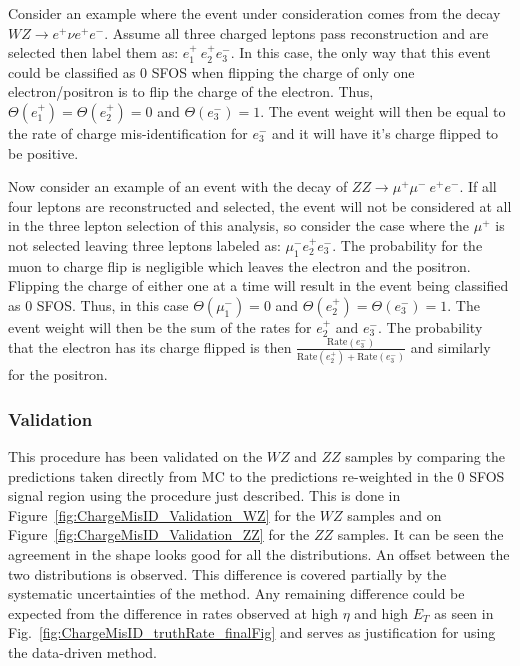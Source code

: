 Consider an example where the event under consideration comes from the 
decay $WZ\rightarrow e^{+}\nu e^{+}e^{-}$. Assume all three charged leptons 
pass reconstruction and are selected then label 
them as: $e^{+}_1~e^{+}_2e^{-}_3$. In this case,
the only way that this event could be classified as 0 SFOS when 
flipping the charge of only one electron/positron is to flip the 
charge of the electron.
Thus, $\Theta(e^{+}_1)=\Theta(e^{+}_2)=0$ and $\Theta(e^{-}_3)=1$.  The event 
weight will then be equal to the rate of charge mis-identification 
for  $e^{-}_3$ and it will have it's charge flipped to be positive.

Now consider an example of an event with 
the decay of $ZZ\rightarrow \mu^{+}\mu^{-}~ e^{+}e^{-}$.
If all four leptons are reconstructed and selected, the event will not 
be considered at all in the three lepton selection of this analysis, so 
consider the case where the $\mu^{+}$ is not selected leaving three leptons 
labeled as: $\mu^{-}_1 e^{+}_2 e^{-}_3$.  The probability for the muon to 
charge flip is negligible which leaves the electron and the positron. Flipping 
the charge of either one at a time will result in the event being 
classified as 0 SFOS.  Thus, in
this case $\Theta(\mu^{-}_1)=0$ and $\Theta(e^{+}_2)=\Theta(e^{-}_3)=1$. The 
event weight will then be the sum of the rates for $e^{+}_2$ and $e^{-}_3$.
The probability that the electron has its charge flipped is then 
$\frac{\textrm{Rate}(e^{-}_3) }{ \textrm{Rate}(e^{+}_2)+ \textrm{Rate}(e^{-}_3)}$ 
and similarly for the positron.

\subsubsection{Validation}
This procedure has been validated on the $WZ$ and $ZZ$ samples by comparing 
the predictions taken directly from MC to the predictions re-weighted in the 
0 SFOS signal region using the procedure just described. This is done in 
Figure~\ref{fig:ChargeMisID_Validation_WZ} for the $WZ$ samples and on 
Figure~\ref{fig:ChargeMisID_Validation_ZZ} for the $ZZ$ samples. It can be seen 
the agreement in the shape looks good for all the distributions. An offset 
between the two distributions is observed. This difference is covered partially by 
the systematic uncertainties of the method.  Any remaining difference could 
be expected from the difference in rates observed at high $\eta$ and 
high $E_{T}$ as seen in Fig.~\ref{fig:ChargeMisID_truthRate_finalFig} and 
serves as justification for using the data-driven method.

